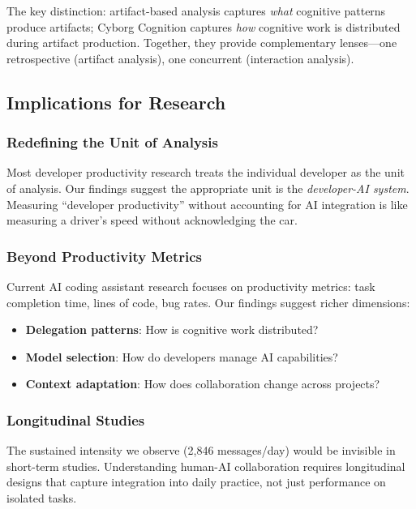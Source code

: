 \documentclass{ntlabs-preprint}
\begin{document}
The key distinction: artifact-based analysis captures \textit{what} cognitive patterns produce artifacts; Cyborg Cognition captures \textit{how} cognitive work is distributed during artifact production. Together, they provide complementary lenses---one retrospective (artifact analysis), one concurrent (interaction analysis).

\subsection{Implications for Research}

\subsubsection{Redefining the Unit of Analysis}

Most developer productivity research treats the individual developer as the unit of analysis. Our findings suggest the appropriate unit is the \textit{developer-AI system}. Measuring ``developer productivity'' without accounting for AI integration is like measuring a driver's speed without acknowledging the car.

\subsubsection{Beyond Productivity Metrics}

Current AI coding assistant research focuses on productivity metrics: task completion time, lines of code, bug rates. Our findings suggest richer dimensions:
\begin{itemize}
    \item \textbf{Delegation patterns}: How is cognitive work distributed?
    \item \textbf{Model selection}: How do developers manage AI capabilities?
    \item \textbf{Context adaptation}: How does collaboration change across projects?
\end{itemize}

\subsubsection{Longitudinal Studies}

The sustained intensity we observe (2,846 messages/day) would be invisible in short-term studies. Understanding human-AI collaboration requires longitudinal designs that capture integration into daily practice, not just performance on isolated tasks.
\end{document}
